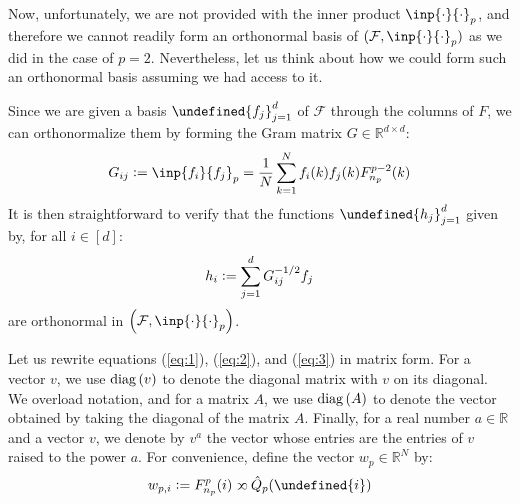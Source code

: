 \documentclass{article}
\theoremstyle{plain}
\theoremstyle{definition}
\theoremstyle{remark}
\newcommand{\defeq}{\vcentcolon=}
\let\brace\undefined
\DeclarePairedDelimiter{\brace}{\lbrace}{\rbrace}
\DeclarePairedDelimiter{\paren}{\lparen}{\rparen}
\newcommand{\toprop}{\mathrel{\mskip1mu\reflectbox{$\propto$}\mskip-1mu}}
\newcommand{\R}{\mathbb{R}}
\DeclareMathOperator{\diag}{diag}
\begin{document}
Now, unfortunately, we are not provided with the inner product $\inp{\cdot}{\cdot}_p$, and therefore we cannot readily form an orthonormal basis of $(\mathcal{F}, \inp{\cdot}{\cdot}_p)$ as we did in the case of $p = 2$. Nevertheless, let us think about how we could form such an orthonormal basis assuming we had access to it.

Since we are given a basis $\brace{f_j}_{j=1}^{d}$ of $\mathcal{F}$ through the columns of $F$, we can orthonormalize them by forming the Gram matrix $G \in \R^{d \times d}$:
\begin{equation}
\label{eq:2}
    G_{ij} \defeq \inp{f_i}{f_j}_p = \frac{1}{N}\sum_{k=1}^{N} f_i(k) f_j(k) F_{n_p}^{p-2}(k)
\end{equation}
It is then straightforward to verify that the functions $\brace{h_j}_{j=1}^{d}$ given by, for all $i \in [d]$:
\begin{equation}
\label{eq:3}
    h_i \defeq \sum_{j=1}^{d} G^{-1/2}_{ij} f_j
\end{equation}
are orthonormal in $\paren*{\mathcal{F}, \inp{\cdot}{\cdot}_p}$. 

Let us rewrite equations (\ref{eq:1}), (\ref{eq:2}), and (\ref{eq:3}) in matrix form. For a vector $v$, we use $\diag{\paren{v}}$ to denote the diagonal matrix with $v$ on its diagonal. We overload notation, and for a matrix $A$, we use $\diag{\paren{A}}$ to denote the vector obtained by taking the diagonal of the matrix $A$. Finally, for a real number $a \in \R$ and a vector $v$, we denote by $v^{a}$ the vector whose entries are the entries of $v$ raised to the power $a$. For convenience, define the vector $w_p \in \R^{N}$ by:
\begin{equation*}
    w_{p, i} \defeq F_{n_p}^{p}(i) \toprop \hat{Q}_p(\brace{i})
\end{equation*}
\end{document}
